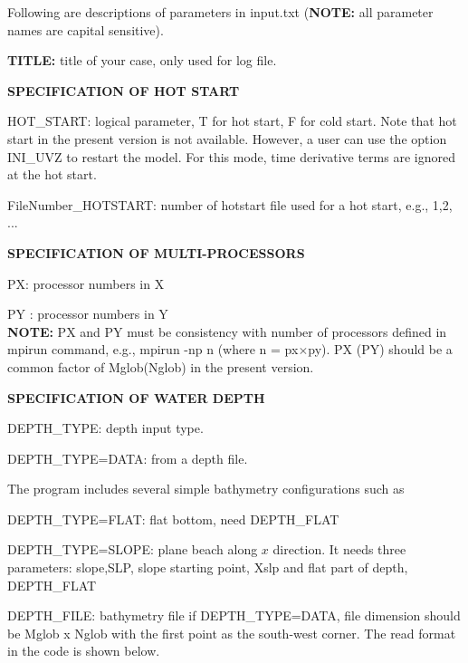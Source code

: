 \documentclass[11pt]{article}
\begin{document}
Following are descriptions of parameters in input.txt
({\bf  NOTE: }  all parameter names are capital sensitive).

 \begin{description}
 
\item {\bf TITLE:}   title of your case, only used for log file. 

\item {\bf SPECIFICATION OF HOT START}

\item HOT\_START:  logical parameter, T for hot start, F for cold start. Note that hot start in the present version is not available. However, a user can use the option INI\_UVZ to restart the model. For this mode, time derivative terms are ignored at the hot start. 

\item FileNumber\_HOTSTART: number of hotstart file used for a hot start, e.g., 1,2, ...

\item {\bf SPECIFICATION OF MULTI-PROCESSORS}

\item PX:  processor numbers in X
\item PY :  processor numbers in Y \\
 {\bf NOTE:} PX and PY must be consistency with number of processors defined in mpirun command, e.g., 
mpirun -np n (where n = px$\times$py). PX (PY) should be a common factor of Mglob(Nglob) in the present version.   

 
 \item {\bf SPECIFICATION OF WATER DEPTH}
 
 \item DEPTH\_TYPE: depth input type. 
 
   DEPTH\_TYPE=DATA: from a depth file. 
   
   The program includes several simple bathymetry configurations such as
   
                DEPTH\_TYPE=FLAT:  flat bottom, need DEPTH\_FLAT 
                
                DEPTH\_TYPE=SLOPE:  plane beach along $x$ direction. It needs three parameters:
                                    slope,SLP,  slope starting point, Xslp
                                   and flat part of depth, DEPTH\_FLAT

\item  DEPTH\_FILE: bathymetry file if  DEPTH\_TYPE=DATA, file dimension should be Mglob x Nglob with the first point as the south-west corner.  The read format in the code is shown below.


\end{description}
\end{document}
